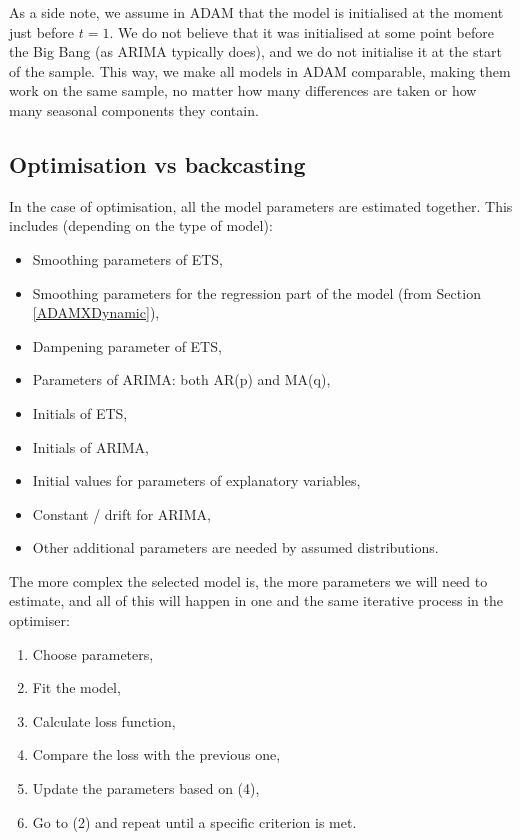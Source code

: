 \documentclass[]{book}
\providecommand{\tightlist}{%
  \setlength{\itemsep}{0pt}\setlength{\parskip}{0pt}}
\theoremstyle{definition}
\theoremstyle{definition}
\theoremstyle{definition}
\theoremstyle{definition}
\theoremstyle{remark}
\begin{document}
As a side note, we assume in ADAM that the model is initialised at the moment just before \(t=1\). We do not believe that it was initialised at some point before the Big Bang (as ARIMA typically does), and we do not initialise it at the start of the sample. This way, we make all models in ADAM comparable, making them work on the same sample, no matter how many differences are taken or how many seasonal components they contain.

\hypertarget{ADAMInitialisationOptAndBack}{%
\subsection{Optimisation vs backcasting}\label{ADAMInitialisationOptAndBack}}

In the case of optimisation, all the model parameters are estimated together. This includes (depending on the type of model):

\begin{itemize}
\tightlist
\item
  Smoothing parameters of ETS,
\item
  Smoothing parameters for the regression part of the model (from Section \ref{ADAMXDynamic}),
\item
  Dampening parameter of ETS,
\item
  Parameters of ARIMA: both AR(p) and MA(q),
\item
  Initials of ETS,
\item
  Initials of ARIMA,
\item
  Initial values for parameters of explanatory variables,
\item
  Constant / drift for ARIMA,
\item
  Other additional parameters are needed by assumed distributions.
\end{itemize}

The more complex the selected model is, the more parameters we will need to estimate, and all of this will happen in one and the same iterative process in the optimiser:

\begin{enumerate}
\def\labelenumi{\arabic{enumi}.}
\tightlist
\item
  Choose parameters,
\item
  Fit the model,
\item
  Calculate loss function,
\item
  Compare the loss with the previous one,
\item
  Update the parameters based on (4),
\item
  Go to (2) and repeat until a specific criterion is met.
\end{enumerate}
\end{document}

